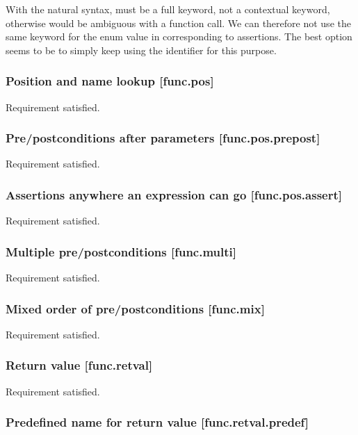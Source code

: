 With the natural syntax,  must be a full keyword, not a contextual keyword, otherwise  would be ambiguous with a function call. We can therefore not use the same keyword for the enum value in  corresponding to assertions. The best option seems to be to simply keep using the identifier  for this purpose.

\subsubsection{Position and name lookup [func.pos]}

Requirement satisfied.

\subsubsection{Pre/postconditions after parameters [func.pos.prepost]}

Requirement satisfied.

\subsubsection{Assertions anywhere an expression can go [func.pos.assert]}

Requirement satisfied.

\subsubsection{Multiple pre/postconditions  [func.multi]}

Requirement satisfied.

\subsubsection{Mixed order of pre/postconditions  [func.mix]}

Requirement satisfied.

\subsubsection{Return value  [func.retval]}

Requirement satisfied.

\subsubsection{Predefined name for return value  [func.retval.predef]}

